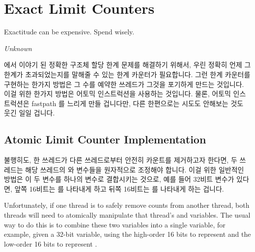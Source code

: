 \section{Exact Limit Counters}
\label{sec:count:Exact Limit Counters}
%
\epigraph{Exactitude can be expensive.  Spend wisely.}{\emph{Unknown}}

\QuickQuizRef{\QcountQexactcnt} 에서 이야기 된 정확한 구조체 할당 한계 문제를
해결하기 위해서, 우린 정확히 언제 그 한계가 초과되었는지를 말해줄 수 있는 한계
카운터가 필요합니다.
그런 한계 카운터를 구현하는 한가지 방법은 그 수를 예약한 쓰레드가 그것을
포기하게 만드는 것입니다.
이걸 위한 한가지 방법은 어토믹 인스트럭션을 사용하는 것입니다.
물론, 어토믹 인스트럭션은 fastpath 를 느리게 만들 겁니다만, 다른 한편으로는
시도도 안해보는 것도 웃긴 일일 겁니다.

\subsection{Atomic Limit Counter Implementation}
\label{sec:count:Atomic Limit Counter Implementation}

불행히도, 한 쓰레드가 다른 쓰레드로부터 안전히 카운트를 제거하고자 한다면, 두
쓰레드는 해당 쓰레드의  와  변수들을 원자적으로
조정해야 합니다.
이걸 위한 일반적인 방법은 이 두 변수를 하나의 변수로 결합시키는 것으로, 예를
들어 32비트 변수가 있다면, 앞쪽 16비트는  를 나타내게 하고 뒤쪽
16비트는  를 나타내게 하는 겁니다.

\iffalse

Unfortunately,
if one thread is to safely remove counts from another thread,
both threads will need to atomically manipulate that thread's
 and  variables.
The usual way to do this is to combine these two variables into a
single variable,
for example, given a 32-bit variable, using the high-order 16 bits to
represent  and the low-order 16 bits to represent
.

